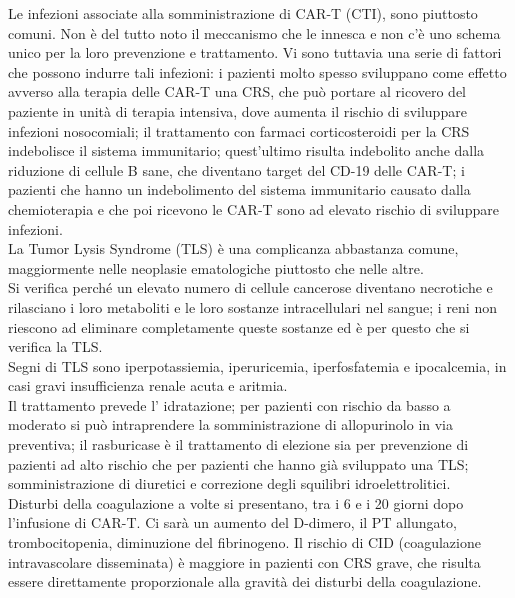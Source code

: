 Le infezioni associate alla somministrazione di CAR-T (CTI), sono piuttosto comuni. Non è del tutto noto il meccanismo 
che le innesca e non c’è uno schema unico per la loro prevenzione e trattamento. Vi sono tuttavia una serie di fattori 
che possono indurre tali infezioni: i pazienti molto spesso sviluppano come effetto avverso alla terapia delle CAR-T 
una CRS, che può portare al ricovero del paziente in unità di terapia intensiva, dove aumenta il rischio di sviluppare 
infezioni nosocomiali; il trattamento con farmaci corticosteroidi per la CRS indebolisce il sistema immunitario; 
quest’ultimo risulta indebolito anche dalla riduzione di cellule B sane, che diventano target del CD-19 delle CAR-T; 
i pazienti che hanno un indebolimento del sistema immunitario causato dalla chemioterapia e che poi ricevono le CAR-T 
sono ad elevato rischio di sviluppare infezioni\cite{Frontiers}.\\

La Tumor Lysis Syndrome (TLS) è una complicanza abbastanza comune, maggiormente nelle neoplasie ematologiche piuttosto 
che nelle altre.\\ 
Si verifica perché un elevato numero di cellule cancerose diventano necrotiche e rilasciano i loro metaboliti e le 
loro sostanze intracellulari nel sangue; i reni non riescono ad eliminare completamente queste sostanze ed è per 
questo che si verifica la TLS.\\ 
Segni di TLS sono iperpotassiemia, iperuricemia, iperfosfatemia e ipocalcemia, in casi gravi insufficienza renale 
acuta e aritmia.\\ 
Il trattamento prevede l’ idratazione; per pazienti con rischio da basso a moderato si può intraprendere la 
somministrazione di allopurinolo in via preventiva; il rasburicase è il trattamento di elezione sia per prevenzione 
di pazienti ad alto rischio che per pazienti che hanno già sviluppato una TLS; somministrazione di diuretici e 
correzione degli squilibri idroelettrolitici\cite{Frontiers}.\\

Disturbi della coagulazione a volte si presentano, tra i 6 e i 20 giorni dopo l’infusione di CAR-T. Ci sarà un  
aumento del D-dimero, il PT allungato, trombocitopenia, diminuzione del fibrinogeno. Il rischio di CID 
(coagulazione intravascolare disseminata) è maggiore in pazienti con CRS grave, 
che risulta essere direttamente proporzionale alla gravità dei disturbi della coagulazione\cite{Frontiers}.\\


